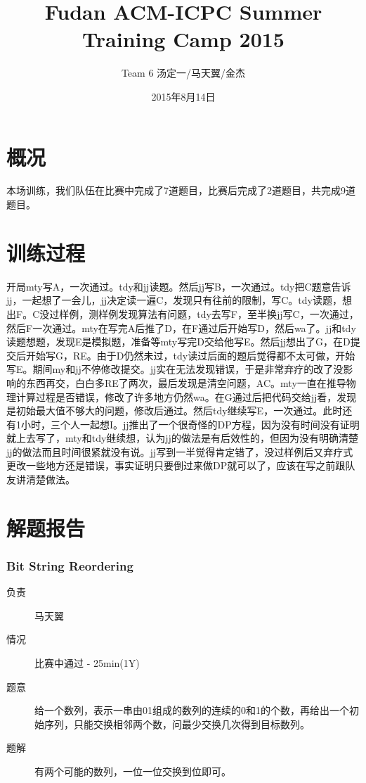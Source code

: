 \documentclass[a4paper, 11pt, nofonts, nocap, fancyhdr]{ctexart}
\title{Fudan ACM-ICPC Summer Training Camp 2015}
\author{Team 6 汤定一/马天翼/金杰}
\date{2015年8月14日}
\newcommand{\problem}[1]{\subsubsection{#1}}
\begin{document}
\maketitle

\section{概况}

本场训练，我们队伍在比赛中完成了7道题目，比赛后完成了2道题目，共完成9道题目。

\section{训练过程}

开局mty写A，一次通过。tdy和jj读题。然后jj写B，一次通过。tdy把C题意告诉jj，一起想了一会儿，jj决定读一遍C，发现只有往前的限制，写C。tdy读题，想出F。C没过样例，测样例发现算法有问题，tdy去写F，至半换jj写C，一次通过，然后F一次通过。mty在写完A后推了D，在F通过后开始写D，然后wa了。jj和tdy读题想题，发现E是模拟题，准备等mty写完D交给他写E。然后jj想出了G，在D提交后开始写G，RE。由于D仍然未过，tdy读过后面的题后觉得都不太可做，开始写E。期间my和jj不停修改提交。jj实在无法发现错误，于是非常弃疗的改了没影响的东西再交，白白多RE了两次，最后发现是清空问题，AC。mty一直在推导物理计算过程是否错误，修改了许多地方仍然wa。在G通过后把代码交给jj看，发现是初始最大值不够大的问题，修改后通过。然后tdy继续写E，一次通过。此时还有1小时，三个人一起想I。jj推出了一个很奇怪的DP方程，因为没有时间没有证明就上去写了，mty和tdy继续想，认为jj的做法是有后效性的，但因为没有明确清楚jj的做法而且时间很紧就没有说。jj写到一半觉得肯定错了，没过样例后又弃疗式更改一些地方还是错误，事实证明只要倒过来做DP就可以了，应该在写之前跟队友讲清楚做法。

\section{解题报告}

\problem{Bit String Reordering}

\begin{description}
\item[负责] 马天翼
\item[情况] 比赛中通过 - 25min(1Y)
\item[题意]
给一个数列，表示一串由01组成的数列的连续的0和1的个数，再给出一个初始序列，只能交换相邻两个数，问最少交换几次得到目标数列。
\item[题解]
有两个可能的数列，一位一位交换到位即可。
\end{description}
\end{document}
